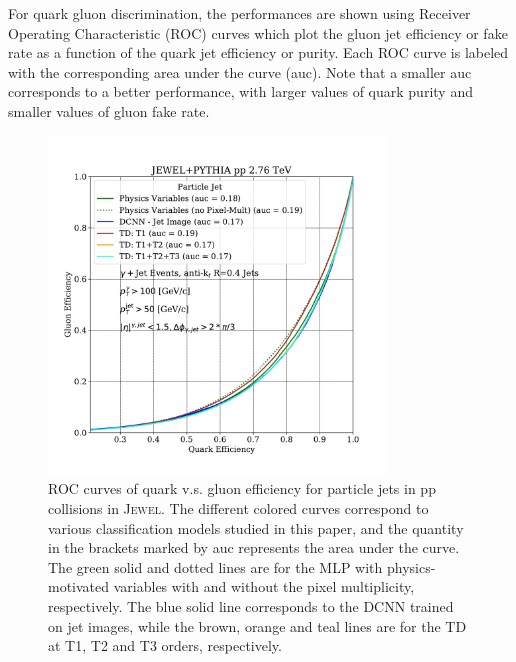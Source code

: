\documentclass[notoc,preprintnumbers]{JHEP3}
\begin{document}
For quark gluon discrimination, the performances are shown using Receiver Operating Characteristic (ROC) curves which plot the gluon jet efficiency or fake rate as a function of the quark jet efficiency or purity. Each ROC curve is labeled with the corresponding area under the curve (auc). Note that a smaller auc corresponds to a better performance, with larger values of quark purity and smaller values of gluon fake rate.

\begin{figure}[h]
	\centering
	\includegraphics[width=0.8\textwidth]{plots/JEWELPYTHIA_pp_2p76TeV_genLevel_QvsG.pdf}
	\caption{ROC curves of quark v.s. gluon efficiency for particle jets in pp collisions in \textsc{Jewel}. The different colored curves correspond to various classification models studied in this paper, and the quantity in the brackets marked by auc represents the area under the curve. The green solid and dotted lines are for the MLP with physics-motivated variables with and without the pixel multiplicity, respectively. The blue solid line corresponds to the DCNN trained on jet images, while the brown, orange and teal lines are for the TD at T1, T2 and T3 orders, respectively.}
\label{fig:ROC_pp}
\end{figure}
\end{document}

